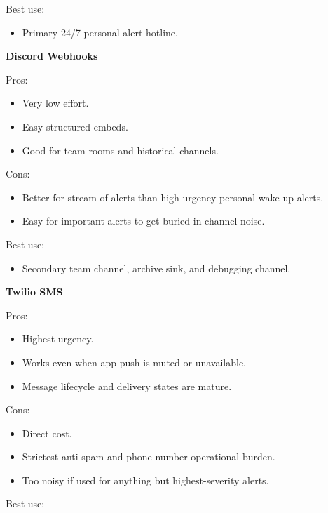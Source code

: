 \documentclass[
]{article}
\providecommand{\tightlist}{%
  \setlength{\itemsep}{0pt}\setlength{\parskip}{0pt}}
\begin{document}
Best use:

\begin{itemize}
\tightlist
\item
  Primary 24/7 personal alert hotline.
\end{itemize}

\textbf{Discord Webhooks}

Pros:

\begin{itemize}
\tightlist
\item
  Very low effort.
\item
  Easy structured embeds.
\item
  Good for team rooms and historical channels.
\end{itemize}

Cons:

\begin{itemize}
\tightlist
\item
  Better for stream-of-alerts than high-urgency personal wake-up alerts.
\item
  Easy for important alerts to get buried in channel noise.
\end{itemize}

Best use:

\begin{itemize}
\tightlist
\item
  Secondary team channel, archive sink, and debugging channel.
\end{itemize}

\textbf{Twilio SMS}

Pros:

\begin{itemize}
\tightlist
\item
  Highest urgency.
\item
  Works even when app push is muted or unavailable.
\item
  Message lifecycle and delivery states are mature.
\end{itemize}

Cons:

\begin{itemize}
\tightlist
\item
  Direct cost.
\item
  Strictest anti-spam and phone-number operational burden.
\item
  Too noisy if used for anything but highest-severity alerts.
\end{itemize}

Best use:
\end{document}

